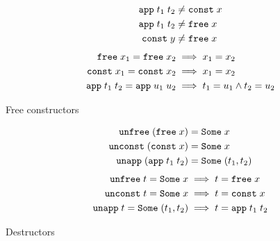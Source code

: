\begin{code}[t]
  \setlength{\abovedisplayskip}{5pt}
  \setlength{\belowdisplayskip}{5pt}
  \setlength{\abovedisplayshortskip}{5pt}
  \setlength{\belowdisplayshortskip}{5pt}
  \begin{subcode}{.5\linewidth}
    \begin{align*}
      \texttt{\textup{app}}\;t_1\;t_2 &\neq \texttt{\textup{const}}\;x \\
      \texttt{\textup{app}}\;t_1\;t_2 &\neq \texttt{\textup{free}}\;x \\
      \texttt{\textup{const}}\;y &\neq \texttt{\textup{free}}\;x
    \end{align*}
    \begin{align*}
      \texttt{\textup{free}}\;x_1 = \texttt{\textup{free}}\;x_2 &\implies x_1 = x_2 \\
      \texttt{\textup{const}}\;x_1 = \texttt{\textup{const}}\;x_2 &\implies x_1 = x_2 \\
      \texttt{\textup{app}}\;t_1\;t_2 = \texttt{\textup{app}}\;u_1\;u_2 &\implies t_1 = u_1 \wedge t_2 = u_2
    \end{align*}
    \caption{Free constructors}
    \label{code:terms:algebra:basic:free}
  \end{subcode}\hfill
  \begin{subcode}{.46\linewidth}
    \begin{align*}
      \texttt{\textup{unfree}}\;(\texttt{\textup{free}}\;x) &= \texttt{\textup{Some}}\;x \\
      \texttt{\textup{unconst}}\;(\texttt{\textup{const}}\;x) &= \texttt{\textup{Some}}\;x \\
      \texttt{\textup{unapp}}\;(\texttt{\textup{app}}\;t_1\;t_2) &= \texttt{\textup{Some}}\;(t_1, t_2)
    \end{align*}
    \begin{align*}
      \texttt{\textup{unfree}}\;t = \texttt{\textup{Some}}\;x &\implies t = \texttt{\textup{free}}\;x \\
      \texttt{\textup{unconst}}\;t = \texttt{\textup{Some}}\;x &\implies t = \texttt{\textup{const}}\;x \\
      \texttt{\textup{unapp}}\;t = \texttt{\textup{Some}}\;(t_1, t_2) &\implies t = \texttt{\textup{app}}\;t_1\;t_2
    \end{align*}
    \caption{Destructors}
  \end{subcode}


\end{code}
